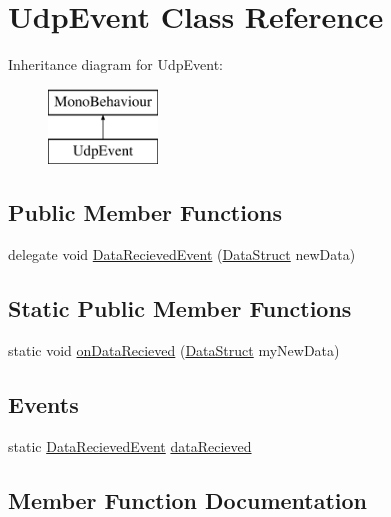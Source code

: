 \hypertarget{class_udp_event}{}\section{Udp\+Event Class Reference}
\label{class_udp_event}
Inheritance diagram for Udp\+Event\+:\begin{figure}[H]
\begin{center}
\leavevmode
\includegraphics[height=2.000000cm]{class_udp_event}
\end{center}
\end{figure}
\subsection*{Public Member Functions}
\begin{DoxyCompactItemize}
\item 
delegate void \hyperlink{class_udp_event_ae4e3558627292b1cc17947ba92a60906}{Data\+Recieved\+Event} (\hyperlink{class_data_struct}{Data\+Struct} new\+Data)
\end{DoxyCompactItemize}
\subsection*{Static Public Member Functions}
\begin{DoxyCompactItemize}
\item 
static void \hyperlink{class_udp_event_a90b37ccb58abcdab80aef5375e48e87d}{on\+Data\+Recieved} (\hyperlink{class_data_struct}{Data\+Struct} my\+New\+Data)
\end{DoxyCompactItemize}
\subsection*{Events}
\begin{DoxyCompactItemize}
\item 
static \hyperlink{class_udp_event_ae4e3558627292b1cc17947ba92a60906}{Data\+Recieved\+Event} \hyperlink{class_udp_event_a0df4003718113a278f920a70e27c261d}{data\+Recieved}
\end{DoxyCompactItemize}


\subsection{Member Function Documentation}
\mbox{\label{class_udp_event_ae4e3558627292b1cc17947ba92a60906}} 
